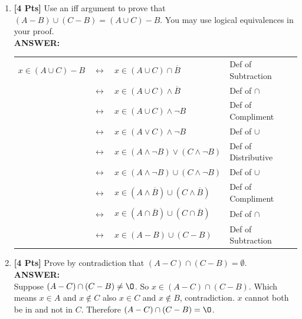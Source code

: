 \documentclass[12pt]{article}
\begin{document}
\begin{enumerate}
\item {\bf [4 Pts]} Use an iff argument to prove that $(A - B) \cup (C - B) = (A \cup C) - B$. You may use logical equivalences in your proof.\\
\textbf{ANSWER:}\\
\begin{table}[h]
\centering
\begin{tabular}{ccll}
$x \in (A \cup C)-B$ & $\leftrightarrow$ & $x \in (A \cup C) \cap \overline{B}$                         & Def of Subtraction  \\
                  	       & $\leftrightarrow$ & $x \in (A \cup C) \wedge \overline{B}$                       & Def of $\cap$         \\
                		       & $\leftrightarrow$ & $x \in (A \cup C) \wedge \neg B$                             & Def of Compliment   \\
            	               & $\leftrightarrow$ & $x \in (A \vee C) \wedge \neg B$                             & Def of $\cup$         \\
                  	       & $\leftrightarrow$ & $x \in (A \wedge \neg B) \vee (C \wedge \neg B)$             & Def of Distributive \\
             	               & $\leftrightarrow$ & $x \in (A \wedge \neg B) \cup (C \wedge \neg B)$             & Def of $\cup$         \\
            	               & $\leftrightarrow$ & $x \in (A \wedge \overline{B}) \cup (C \wedge \overline{B})$ & Def of Compliment   \\
            	               & $\leftrightarrow$ & $x \in (A \cap \overline{B}) \cup (C \cap \overline{B})$ & Def of $\cap$   \\
                 	      & $\leftrightarrow$ & $x \in (A - B) \cup (C - B)$                                 & Def of Subtraction
\end{tabular}
\end{table}
\item {\bf [4 Pts]} Prove by contradiction that $(A - C) \cap (C - B) = \emptyset$.\\
\textbf{ANSWER:}\\

Suppose $(A - C) \cap (C - B) \neq \O$. So $x \in (A-C) \cap (C-B)$. 
Which means $x \in A$ and $x \notin C$ also $x \in C$ and $x \notin B$, contradiction. 
$x$ cannot both be in and not in $C$. 
Therefore $(A-C) \cap (C-B) = \O$.


\end{enumerate}
\end{document}
